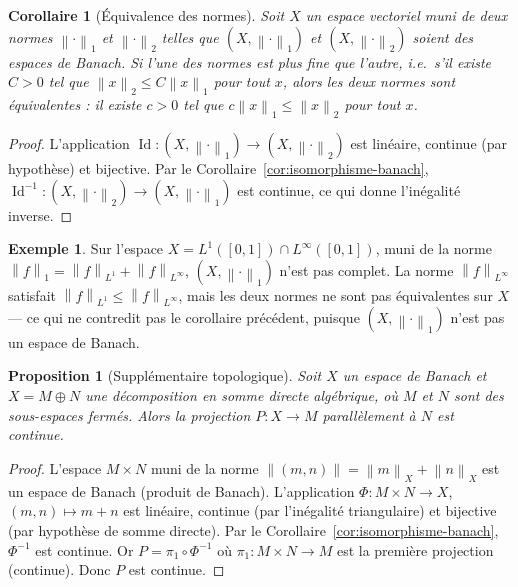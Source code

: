 \documentclass[a4paper,12pt]{book}
\DeclareMathOperator{\Id}{Id}
\newcommand{\norm}[1]{\left\| #1 \right\|}
\theoremstyle{definition}
\newtheorem{exemple}[definition]{Exemple}
\theoremstyle{plain}
\newtheorem{proposition}[definition]{Proposition}
\newtheorem{corollaire}[definition]{Corollaire}
\theoremstyle{remark}
\begin{document}
\begin{corollaire}[Équivalence des normes]
\label{cor:equivalence-normes}
Soit $X$ un espace vectoriel muni de deux normes $\norm{\cdot}_1$ et $\norm{\cdot}_2$
telles que $(X, \norm{\cdot}_1)$ et $(X, \norm{\cdot}_2)$ soient des espaces de
Banach. Si l'une des normes est plus fine que l'autre, i.e.\ s'il existe $C > 0$
tel que $\norm{x}_2 \leq C \norm{x}_1$ pour tout $x$, alors les deux normes sont
équivalentes : il existe $c > 0$ tel que $c\norm{x}_1 \leq \norm{x}_2$ pour tout $x$.
\end{corollaire}

\begin{proof}
L'application $\Id : (X, \norm{\cdot}_1) \to (X, \norm{\cdot}_2)$ est linéaire,
continue (par hypothèse) et bijective. Par le Corollaire~\ref{cor:isomorphisme-banach},
$\Id^{-1} : (X, \norm{\cdot}_2) \to (X, \norm{\cdot}_1)$ est continue, ce qui donne
l'inégalité inverse.
\end{proof}

\begin{exemple}
\label{ex:normes-Lp}
Sur l'espace $X = L^1([0,1]) \cap L^\infty([0,1])$, muni de la norme
$\norm{f}_1 = \norm{f}_{L^1} + \norm{f}_{L^\infty}$, $(X, \norm{\cdot}_1)$ n'est
pas complet. La norme $\norm{f}_{L^\infty}$ satisfait $\norm{f}_{L^1} \leq \norm{f}_{L^\infty}$,
mais les deux normes ne sont pas équivalentes sur $X$ --- ce qui ne contredit pas
le corollaire précédent, puisque $(X, \norm{\cdot}_1)$ n'est pas un espace de Banach.
\end{exemple}

\begin{proposition}[Supplémentaire topologique]
\label{prop:supplementaire-topo}
Soit $X$ un espace de Banach et $X = M \oplus N$ une décomposition en somme
directe algébrique, où $M$ et $N$ sont des sous-espaces fermés.
Alors la projection $P : X \to M$ parallèlement à $N$ est continue.
\end{proposition}

\begin{proof}
L'espace $M \times N$ muni de la norme $\norm{(m,n)} = \norm{m}_X + \norm{n}_X$
est un espace de Banach (produit de Banach). L'application
$\Phi : M \times N \to X$, $(m,n) \mapsto m+n$ est linéaire, continue (par
l'inégalité triangulaire) et bijective (par hypothèse de somme directe).
Par le Corollaire~\ref{cor:isomorphisme-banach}, $\Phi^{-1}$ est continue.
Or $P = \pi_1 \circ \Phi^{-1}$ où $\pi_1 : M \times N \to M$ est la première
projection (continue). Donc $P$ est continue.
\end{proof}
\end{document}
